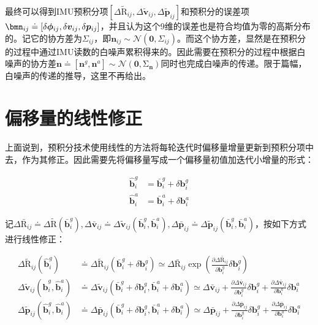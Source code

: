 最终可以得到IMU预积分项$\left[\Delta\tilde{\mathrm R}_{ij},\Delta\tilde{\bm v}_{ij},\Delta\tilde{\bm p}_{ij}\right]$和预积分的误差项$\bmn_{ij} \doteq \left[\delta\bm\phi_{ij},\delta\bm{v}_{ij},\delta\bm{p}_{ij}\right]$，并且认为这个$9$维的误差也是符合均值为零的高斯分布的。记它的协方差为$\Sigma_{ij}$，即$\bm{n}_{ij} \sim \mathcal{N}\left(\bm{0},\Sigma_{ij}\right)$。而这个协方差，显然是在预积分的过程中通过IMU读数的白噪声累积得来的。因此需要在预积分的过程中根据白噪声的协方差$\bm{n} \doteq \left[\bm{n}^g,\bm{n}^a\right] \sim \mathcal{N}(\bm{0},\mathrm\Sigma_{\bm{n}})$同时也完成白噪声的传递。限于篇幅，白噪声的传递的推导，这里不再给出。

\section{偏移量的线性修正}

上面说到，预积分技术使用线性的方法将每轮迭代时偏移量增量更新到预积分项中去，作为其修正。因此需要先将偏移量写成一个偏移量初值加迭代小增量的形式：

\begin{equation}
\begin{aligned}
    \hat{\bm b}^g_i &= \bar{\bm b}^g_i + \delta\bm{b}^g_i \\
    \hat{\bm b}^a_i &= \bar{\bm b}^a_i + \delta\bm{b}^a_i
\end{aligned}
\end{equation}

记$\Delta\bar{\mathrm R}_{ij}\doteq\Delta\tilde{\mathrm R}(\bar{\bm b}^g_i), \Delta\bar{\bm v}_{ij}\doteq\Delta\tilde{\bm v}_{ij}(\bar{\bm b}^g_i,\bar{\bm b}^a_i), \Delta\bar{\bm p}_{ij}\doteq\Delta\tilde{\bm p}_{ij}(\bar{\bm b}^g_i,\bar{\bm b}^a_i)$，按如下方式进行线性修正：

\begin{equation}
\begin{aligned}
    \Delta\tilde{\mathrm R}_{ij}(\hat{\bm b}_i^g)
  &\doteq \Delta\tilde{\mathrm R}_{ij}(\bar{\bm b}^g_i + \delta\bm{b}^g_i)
  \simeq \Delta\bar{\mathrm R}_{ij}
  \exp\left(
      \tfrac{\partial\Delta\bar{\mathrm R}_{ij}}{\partial\bm{b}^g_i}
      \delta\bm{b}^g_i
  \right) \\
  \Delta\tilde{\bm v}_{ij}(\hat{\bm b}^g_i,\hat{\bm b}^a_i)
  &\doteq \Delta\tilde{\bm v}_{ij}(
  \bar{\bm b}^g_i + \delta\bm{b}^g_i,
  \bar{\bm b}^a_i + \delta\bm{b}^a_i)
  \simeq \Delta\bar{\bm v}_{ij} +
  \tfrac{\partial\Delta\bar{\bm v}_{ij}}{\partial\bm{b}^g_i}
  \delta\bm{b}^g_i +
  \tfrac{\partial\Delta\bar{\bm v}_{ij}}{\partial\bm{b}^a_i}
  \delta\bm{b}^a_i \\
  \Delta\tilde{\bm p}_{ij}(\hat{\bm b}^g_i,\hat{\bm b}^a_i)
  &\doteq \Delta\bar{\bm p}_{ij}(
  \bar{\bm b}^g_i + \delta\bm{b}^g_i,
  \bar{\bm b}^a_i + \delta\bm{b}^a_i)
  \simeq \Delta\bar{\bm p}_{ij} +
  \tfrac{\partial\Delta\bar{\bm p}_{ij}}{\partial\bm{b}^g_i}
  \delta\bm{b}^g_i +
  \tfrac{\partial\Delta\bar{\bm p}_{ij}}{\partial\bm{b}^a_i}
  \delta\bm{b}^a_i
\end{aligned}\label{eq:bias_upd}
\end{equation}

